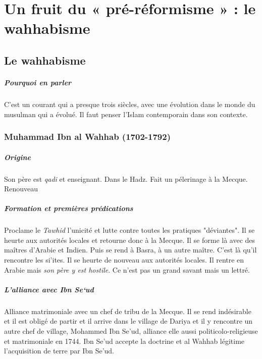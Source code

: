 \chapter{Un fruit du « pré-réformisme » : le wahhabisme}

\section{Le wahhabisme}
\paragraph{Pourquoi en parler} C'est un courant qui a presque trois siècles, avec une évolution dans le monde du musulman qui a évolué. Il faut penser l'Islam contemporain dans son contexte.

 
  \subsection{Muhammad Ibn al Wahhab
  (1702-1792)} 
  \label{Theol:AlWahhab}
  
\paragraph{Origine} Son père est \emph{qadi} et enseignant. Dans le Hadz. Fait un pélerinage à la Mecque. Renouveau

\paragraph{Formation et premières prédications} Proclame le \emph{Tawhid} l'unicité et lutte contre toutes les pratiques "déviantes". Il se heurte aux autorités locales et retourne donc à la Mecque. Il se forme là avec des maîtres d'Arabie et Indien. Puis se rend à Basra, à un autre maître. C'est là qu'il rencontre les si'ites. Il se heurte de nouveau aux autorités locales. Il rentre en Arabie mais \textit{son père y est hostile}. Ce n'est pas un grand savant mais un lettré. 
 
\paragraph{L'alliance avec Ibn Se`ud} Alliance matrimoniale avec un chef de tribu de la Mecque. Il se rend indésirable et il est obligé de partir et il arrive dans le village de Dariya et il y rencontre un autre chef de village, Mohammed Ibn Se'ud, alliance elle aussi politicolo-religieuse et matrimoniale en 1744. Ibn Se'ud accepte la doctrine et al Wahhab légitime l'acquisition de terre par Ibn Se'ud. 

